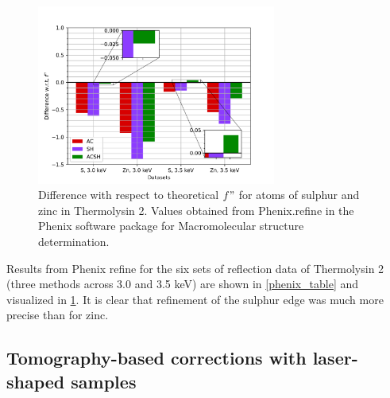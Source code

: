 \begin{figure}[h]
    \centering
    \includegraphics[width = 0.7\textwidth]{plots/phenix_plot_Pat.png}
    \caption{Difference with respect to theoretical $f"$ for atoms of sulphur and zinc in Thermolysin 2. Values obtained from Phenix.refine in the Phenix software package for Macromolecular structure determination.}
    \label{fig:phenix_plot}
\end{figure}

Results from Phenix refine for the six sets of reflection data of Thermolysin 2 (three methods across 3.0 and 3.5 keV) are shown in \cref{phenix_table} and visualized in \cref{fig:phenix_plot}. It is clear that refinement of the sulphur edge was much more precise than for zinc.


\subsection{Tomography-based corrections with laser-shaped samples}

